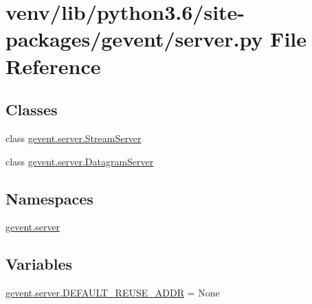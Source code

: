 \hypertarget{venv_2lib_2python3_86_2site-packages_2gevent_2server_8py}{}\section{venv/lib/python3.6/site-\/packages/gevent/server.py File Reference}
\label{venv_2lib_2python3_86_2site-packages_2gevent_2server_8py}
\subsection*{Classes}
\begin{DoxyCompactItemize}
\item 
class \hyperlink{classgevent_1_1server_1_1_stream_server}{gevent.\+server.\+Stream\+Server}
\item 
class \hyperlink{classgevent_1_1server_1_1_datagram_server}{gevent.\+server.\+Datagram\+Server}
\end{DoxyCompactItemize}
\subsection*{Namespaces}
\begin{DoxyCompactItemize}
\item 
 \hyperlink{namespacegevent_1_1server}{gevent.\+server}
\end{DoxyCompactItemize}
\subsection*{Variables}
\begin{DoxyCompactItemize}
\item 
\hyperlink{namespacegevent_1_1server_a0057b5e7f72886b334e710fd3ae365c0}{gevent.\+server.\+D\+E\+F\+A\+U\+L\+T\+\_\+\+R\+E\+U\+S\+E\+\_\+\+A\+D\+DR} = None
\end{DoxyCompactItemize}
